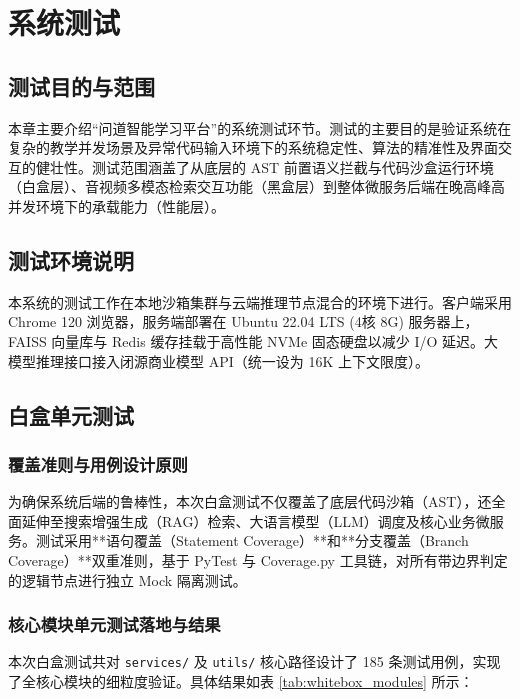 \chapter{系统测试}


\section{测试目的与范围}
本章主要介绍“问道智能学习平台”的系统测试环节。测试的主要目的是验证系统在复杂的教学并发场景及异常代码输入环境下的系统稳定性、算法的精准性及界面交互的健壮性。测试范围涵盖了从底层的 AST 前置语义拦截与代码沙盒运行环境（白盒层）、音视频多模态检索交互功能（黑盒层）到整体微服务后端在晚高峰高并发环境下的承载能力（性能层）。

\section{测试环境说明}


本系统的测试工作在本地沙箱集群与云端推理节点混合的环境下进行。客户端采用 Chrome 120 浏览器，服务端部署在 Ubuntu 22.04 LTS (4核 8G) 服务器上，FAISS 向量库与 Redis 缓存挂载于高性能 NVMe 固态硬盘以减少 I/O 延迟。大模型推理接口接入闭源商业模型 API（统一设为 16K 上下文限度）。


\section{白盒单元测试}
\subsection{覆盖准则与用例设计原则}
为确保系统后端的鲁棒性，本次白盒测试不仅覆盖了底层代码沙箱（AST），还全面延伸至搜索增强生成（RAG）检索、大语言模型（LLM）调度及核心业务微服务。测试采用**语句覆盖（Statement Coverage）**和**分支覆盖（Branch Coverage）**双重准则，基于 PyTest 与 Coverage.py 工具链，对所有带边界判定的逻辑节点进行独立 Mock 隔离测试。

\subsection{核心模块单元测试落地与结果}
本次白盒测试共对 \texttt{services/} 及 \texttt{utils/} 核心路径设计了 185 条测试用例，实现了全核心模块的细粒度验证。具体结果如表 \ref{tab:whitebox_modules} 所示：

